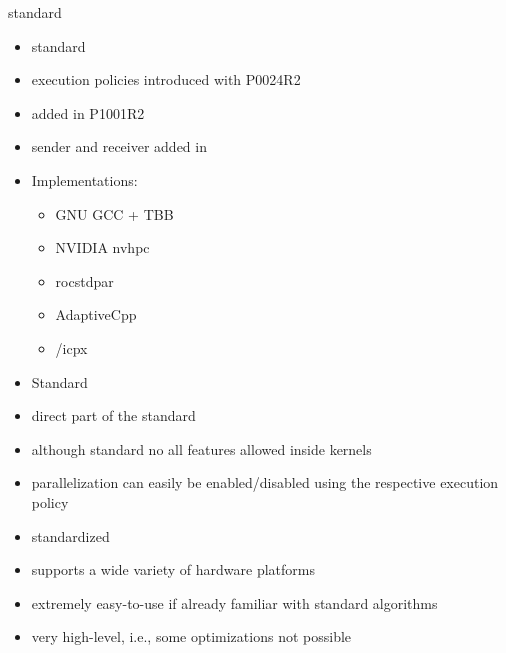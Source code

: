 standard \cpp
\begin{itemize}
    \item {} standard~\cite{international_organization_for_standardization_isoiec_2017}
    \item execution policies introduced with  P0024R2~\cite{hoberock_p0024r2_2016}
    \item {} added in  P1001R2~\cite{meredith_p1001r2_2019}
    \item sender and receiver added in ~\cite{dominiak_p2300r10_2024, baker_p3396r0_2024, niebler_p3325r5_2024}
    \item Implementations:
    \begin{itemize}
        \item GNU GCC + TBB
        \item NVIDIA nvhpc
        \item rocstdpar
        \item AdaptiveCpp
        \item \dpcpp/icpx
    \end{itemize}
\end{itemize}


\begin{itemize}
    \item Standard \cpp
    \item direct part of the  standard
    \item although standard \cpp no all \cpp features allowed inside kernels
    \item parallelization can easily be enabled/disabled using the respective execution policy
\end{itemize}


\begin{advantagebox}
    \begin{itemize}
        \item standardized
        \item supports a wide variety of hardware platforms
        \item extremely easy-to-use if already familiar with \cpp standard algorithms
    \end{itemize}
\end{advantagebox}

\begin{disadvantagebox}
    \begin{itemize}
        \item very high-level, i.e., some optimizations not possible
    \end{itemize}
\end{disadvantagebox}

